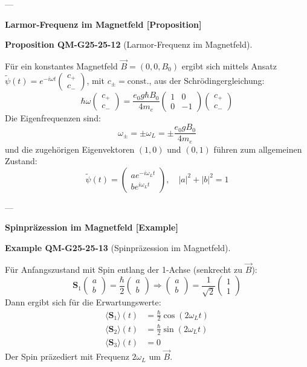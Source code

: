 \documentclass[10pt, letterpaper]{article}
\newcommand{\CustomHeading}[3]{%
  \par\medskip\noindent%
  \textbf{#1 #2} \textnormal{(#3)}.\enskip%
}
\newenvironment{PROP}[2]{\begin{unitbox}\CustomHeading{Proposition}{#1}{#2}}{\end{unitbox}}
\newenvironment{EXA}[2]{\begin{unitbox}\CustomHeading{Example}{#1}{#2}}{\end{unitbox}}
\begin{document}
---

\textbf{Larmor-Frequenz im Magnetfeld [Proposition]}

\begin{PROP}{QM-G25-25-12}{Larmor-Frequenz im Magnetfeld}
Für ein konstantes Magnetfeld \( \vec{B} = (0, 0, B_0) \) ergibt sich mittels Ansatz \( \tilde{\psi}(t) = e^{-i \omega t} \begin{pmatrix} c_+ \\ c_- \end{pmatrix} \), mit \( c_\pm = \text{const.} \), aus der Schrödingergleichung:
\[
\hbar \omega \begin{pmatrix} c_+ \\ c_- \end{pmatrix}
= \frac{e_0 g \hbar B_0}{4 m_e}
\begin{pmatrix} 1 & 0 \\ 0 & -1 \end{pmatrix}
\begin{pmatrix} c_+ \\ c_- \end{pmatrix}
\]
Die Eigenfrequenzen sind:
\[
\omega_{\pm} = \pm \omega_L = \pm \frac{e_0 g B_0}{4 m_e}
\]
und die zugehörigen Eigenvektoren \( (1,0) \) und \( (0,1) \) führen zum allgemeinen Zustand:
\[
\tilde{\psi}(t) = \begin{pmatrix} a e^{-i \omega_L t} \\ b e^{i \omega_L t} \end{pmatrix},
\quad |a|^2 + |b|^2 = 1
\]
\end{PROP}

---

\textbf{Spinpräzession im Magnetfeld [Example]}

\begin{EXA}{QM-G25-25-13}{Spinpräzession im Magnetfeld}
Für Anfangszustand mit Spin entlang der 1-Achse (senkrecht zu \( \vec{B} \)):
\[
\mathbf{S}_1 \begin{pmatrix} a \\ b \end{pmatrix} = \frac{\hbar}{2} \begin{pmatrix} a \\ b \end{pmatrix}
\Rightarrow \begin{pmatrix} a \\ b \end{pmatrix} = \frac{1}{\sqrt{2}} \begin{pmatrix} 1 \\ 1 \end{pmatrix}
\]
Dann ergibt sich für die Erwartungswerte:
\[
\begin{aligned}
\langle \mathbf{S}_1 \rangle(t) &= \frac{\hbar}{2} \cos (2 \omega_L t) \\
\langle \mathbf{S}_2 \rangle(t) &= \frac{\hbar}{2} \sin (2 \omega_L t) \\
\langle \mathbf{S}_3 \rangle(t) &= 0
\end{aligned}
\]
Der Spin präzediert mit Frequenz \( 2\omega_L \) um \( \vec{B} \).
\end{EXA}
\end{document}
